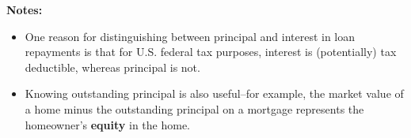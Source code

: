 \documentclass[12pt]{article}
\begin{document}
\begin{flushleft}
    \textbf{Notes:} \\
\end{flushleft}

\begin{itemize}
    \item One reason for distinguishing between principal and interest in loan repayments is that for U.S.
          federal tax purposes, interest is (potentially) tax deductible, whereas principal is not.
    \item Knowing outstanding principal is also useful--for example, the market value of a home minus the
          outstanding principal on a mortgage represents the homeowner's \textbf{equity} in the home.
\end{itemize}
\end{document}
